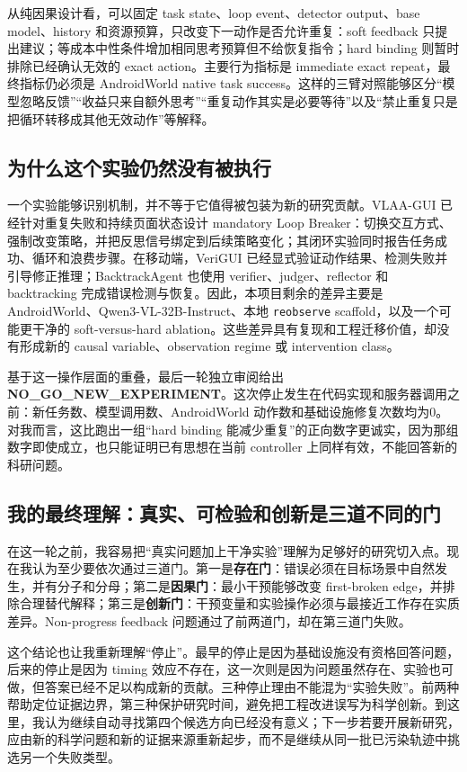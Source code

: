 \documentclass[12pt,a4paper]{ctexart}
\newcommand{\code}[1]{\texttt{#1}}
\begin{document}
从纯因果设计看，可以固定 task state、loop event、detector output、base model、history 和资源预算，只改变下一动作是否允许重复：soft feedback 只提出建议；等成本中性条件增加相同思考预算但不给恢复指令；hard binding 则暂时排除已经确认无效的 exact action。主要行为指标是 immediate exact repeat，最终指标仍必须是 AndroidWorld native task success。这样的三臂对照能够区分“模型忽略反馈”“收益只来自额外思考”“重复动作其实是必要等待”以及“禁止重复只是把循环转移成其他无效动作”等解释。

\subsection{为什么这个实验仍然没有被执行}

一个实验能够识别机制，并不等于它值得被包装为新的研究贡献。VLAA-GUI 已经针对重复失败和持续页面状态设计 mandatory Loop Breaker：切换交互方式、强制改变策略，并把反思信号绑定到后续策略变化；其闭环实验同时报告任务成功、循环和浪费步骤\cite{vlaagui}。在移动端，VeriGUI 已经显式验证动作结果、检测失败并引导修正推理\cite{verigui}；BacktrackAgent 也使用 verifier、judger、reflector 和 backtracking 完成错误检测与恢复\cite{backtrackagent}。因此，本项目剩余的差异主要是 AndroidWorld、Qwen3-VL-32B-Instruct、本地 \code{reobserve} scaffold，以及一个可能更干净的 soft-versus-hard ablation。这些差异具有复现和工程迁移价值，却没有形成新的 causal variable、observation regime 或 intervention class。

基于这一操作层面的重叠，最后一轮独立审阅给出 \textbf{NO\_GO\_NEW\_EXPERIMENT}。这次停止发生在代码实现和服务器调用之前：新任务数、模型调用数、AndroidWorld 动作数和基础设施修复次数均为0。对我而言，这比跑出一组“hard binding 能减少重复”的正向数字更诚实，因为那组数字即使成立，也只能证明已有思想在当前 controller 上同样有效，不能回答新的科研问题。

\subsection{我的最终理解：真实、可检验和创新是三道不同的门}

在这一轮之前，我容易把“真实问题加上干净实验”理解为足够好的研究切入点。现在我认为至少要依次通过三道门。第一是\textbf{存在门}：错误必须在目标场景中自然发生，并有分子和分母；第二是\textbf{因果门}：最小干预能够改变 first-broken edge，并排除合理替代解释；第三是\textbf{创新门}：干预变量和实验操作必须与最接近工作存在实质差异。Non-progress feedback 问题通过了前两道门，却在第三道门失败。

这个结论也让我重新理解“停止”。最早的停止是因为基础设施没有资格回答问题，后来的停止是因为 timing 效应不存在，这一次则是因为问题虽然存在、实验也可做，但答案已经不足以构成新的贡献。三种停止理由不能混为“实验失败”。前两种帮助定位证据边界，第三种保护研究时间，避免把工程改进误写为科学创新。到这里，我认为继续自动寻找第四个候选方向已经没有意义；下一步若要开展新研究，应由新的科学问题和新的证据来源重新起步，而不是继续从同一批已污染轨迹中挑选另一个失败类型。
\end{document}
